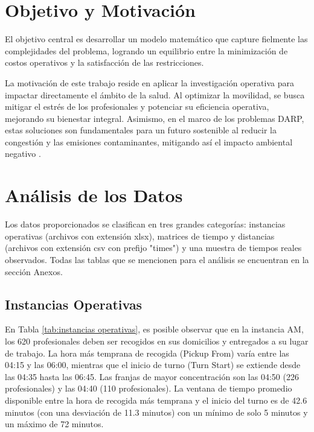 \section{Objetivo y Motivación}
El objetivo central es desarrollar un modelo matemático que capture fielmente las complejidades del problema, logrando un equilibrio entre la minimización de costos operativos y la satisfacción de las restricciones.

La motivación de este trabajo reside en aplicar la investigación operativa para impactar directamente el ámbito de la salud. Al optimizar la movilidad, se busca mitigar el estrés de los profesionales y potenciar su eficiencia operativa, mejorando su bienestar integral. Asimismo, en el marco de los problemas DARP, estas soluciones son fundamentales para un futuro sostenible al reducir la congestión y las emisiones contaminantes, mitigando así el impacto ambiental negativo \cite{Gaul2025}.


\section{Análisis de los Datos} %

Los datos proporcionados se clasifican en tres grandes categorías: instancias operativas (archivos con extensión xlsx), matrices de tiempo y distancias (archivos con extensión csv con prefijo "times") y una muestra de tiempos reales observados. Todas las tablas que se mencionen para el análisis se encuentran en la sección Anexos.

\subsection{Instancias Operativas}

En Tabla \ref{tab:instancias operativas}, es posible observar que en la instancia AM, los 620 profesionales deben ser recogidos en sus domicilios y entregados a su lugar de trabajo. La hora más temprana de recogida (Pickup From) varía entre las 04:15 y las 06:00, mientras que el inicio de turno (Turn Start) se extiende desde las 04:35 hasta las 06:45. Las franjas de mayor concentración son las 04:50 (226 profesionales) y las 04:40 (110 profesionales). La ventana de tiempo promedio disponible entre la hora de recogida más temprana y el inicio del turno es de 42.6 minutos (con una desviación de 11.3 minutos) con un mínimo de solo 5 minutos y un máximo de 72 minutos.

